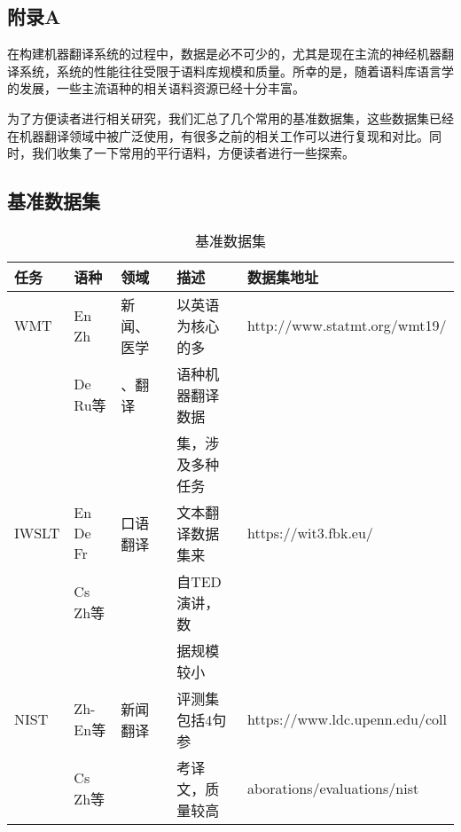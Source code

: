 \begin{appendices}
\chapter{附录A}
\label{appendix-A}
\parinterval 在构建机器翻译系统的过程中，数据是必不可少的，尤其是现在主流的神经机器翻译系统，系统的性能往往受限于语料库规模和质量。所幸的是，随着语料库语言学的发展，一些主流语种的相关语料资源已经十分丰富。

\parinterval 为了方便读者进行相关研究，我们汇总了几个常用的基准数据集，这些数据集已经在机器翻译领域中被广泛使用，有很多之前的相关工作可以进行复现和对比。同时，我们收集了一下常用的平行语料，方便读者进行一些探索。


\section{基准数据集}

\begin{table}[htp]{
\footnotesize
\begin{center}
\caption{基准数据集}
\label{tab:Reference-data-set}
\begin{tabular}{p{1.6cm} | p{1.2cm} p{1.6cm} p{2.6cm} p{3.9cm}}
{任务} & {语种} &{领域} &{描述} &{数据集地址} \\
\hline
\rule{0pt}{15pt}WMT & En Zh& 新闻、医学 & 以英语为核心的多& {http://www.statmt.org/wmt19/} \\
 & De Ru等 & 、翻译 & 语种机器翻译数据 & \\
 & & & 集，涉及多种任务 & \\
\rule{0pt}{15pt}IWSLT & En De Fr & 口语翻译 & 文本翻译数据集来 & {https://wit3.fbk.eu/} \\
 &  Cs Zh等 &  &自TED演讲，数 & \\
 &  &  & 据规模较小 & \\
\rule{0pt}{15pt}NIST & Zh-En等 & 新闻翻译 & 评测集包括4句参 & {https://www.ldc.upenn.edu/coll} \\
 &  Cs Zh等 &  & 考译文，质量较高 & aborations/evaluations/nist \\
\end{tabular}
\end{center}
}\end{table}


\end{appendices}
